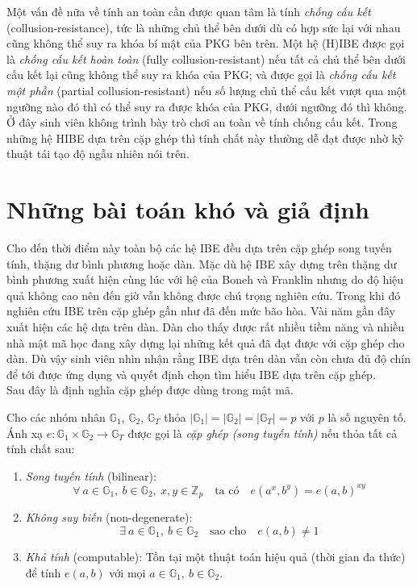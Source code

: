 \documentclass[class=report, crop=false]{standalone}
\begin{document}
			Một vấn đề nữa về tính an toàn cần được quan tâm là tính \textit{chống cấu kết} (collusion-resistance), tức là những chủ thể bên dưới dù có hợp sức lại với nhau cũng không thể suy ra khóa bí mật của PKG bên trên. Một hệ (H)IBE được gọi là \textit{chống cấu kết hoàn toàn} (fully collusion-resistant) nếu tất cả chủ thể bên dưới cấu kết lại cũng không thể suy ra khóa của PKG; và được gọi là \textit{chống cấu kết một phần} (partial collusion-resistant) nếu số lượng chủ thể cấu kết vượt qua một ngưỡng nào đó thì có thể suy ra được khóa của PKG, dưới ngưỡng đó thì không. Ở đây sinh viên không trình bày trò chơi an toàn về tính chống cấu kết. Trong những hệ HIBE dựa trên cặp ghép thì tính chất này thường dễ đạt được nhờ kỹ thuật tái tạo độ ngẫu nhiên nói trên.
	\section{Những bài toán khó và giả định}
		Cho đến thời điểm này toàn bộ các hệ IBE đều dựa trên cặp ghép song tuyến tính, thặng dư bình phương hoặc dàn. Mặc dù hệ IBE xây dựng trên thặng dư bình phương \cite{DBLP:conf/ima/Cocks01} xuất hiện cùng lúc với hệ của Boneh và Franklin \cite{DBLP:conf/crypto/BonehF01} nhưng do độ hiệu quả không cao nên đến giờ vẫn không được chú trọng nghiên cứu. Trong khi đó nghiên cứu IBE trên cặp ghép gần như đã đến mức bão hòa. Vài năm gần đây xuất hiện các hệ dựa trên dàn. Dàn cho thấy được rất nhiều tiềm năng và nhiều nhà mật mã học đang xây dựng lại những kết quả đã đạt được với cặp ghép cho dàn. Dù vậy sinh viên nhìn nhận rằng IBE dựa trên dàn vẫn còn chưa đủ độ chín để tới được ứng dụng và quyết định chọn tìm hiểu IBE dựa trên cặp ghép. \\ \indent
		Sau đây là định nghĩa cặp ghép được dùng trong mật mã.
		\begin{definition}
			Cho các nhóm nhân $\mathbb{G}_1$, $\mathbb{G}_2$, $\mathbb{G}_T$ thỏa $|\mathbb{G}_1| = |\mathbb{G}_2| = |\mathbb{G}_T| = p$ với $p$ là số nguyên tố. Ánh xạ $e: \mathbb{G}_1 \times \mathbb{G}_2 \rightarrow \mathbb{G}_T$ được gọi là \textit{cặp ghép (song tuyến tính)} nếu thỏa tất cả tính chất sau:
			\vspace{-0.5cm}
			\begin{enumerate}[leftmargin=1.5cm, itemindent=-0.5cm]
				\item \textit{Song tuyến tính} (bilinear):
				\[
					\forall\ a \in \mathbb{G}_1,\ b \in \mathbb{G}_2,\ x, y \in \mathbb{Z}_p \quad \text{ta có} \quad e(a^x, b^y) = e(a, b)^{xy}
				\]
				\item \textit{Không suy biến} (non-degenerate):
				\[
					\exists\ a \in \mathbb{G}_1,\ b \in \mathbb{G}_2 \quad \text{sao cho} \quad e(a, b) \neq 1
				\]
				\item \textit{Khả tính} (computable):
				Tồn tại một thuật toán hiệu quả (thời gian đa thức) để tính $e(a, b)$ với mọi $a \in \mathbb{G}_1,\ b \in \mathbb{G}_2$.
			\end{enumerate}
		\end{definition}
\end{document}
